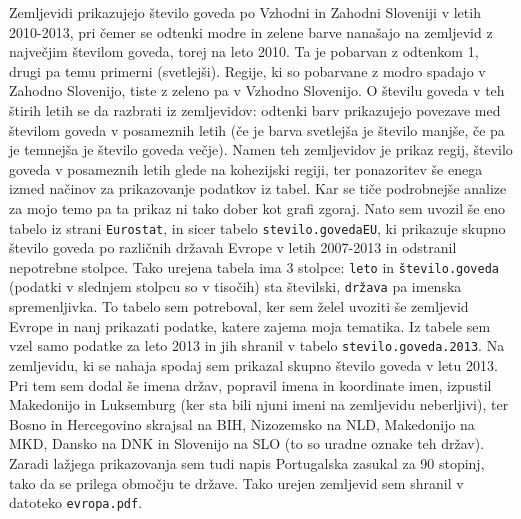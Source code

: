 \documentclass[11pt,a4paper]{article}
\begin{document}
\newline
\newline
Zemljevidi prikazujejo število goveda po Vzhodni in Zahodni Sloveniji v letih 2010-2013, pri čemer se odtenki modre in zelene barve nanašajo na zemljevid z največjim številom goveda, torej na leto 2010. Ta je pobarvan z odtenkom 1, drugi pa temu primerni (svetlejši). Regije, ki so pobarvane z modro spadajo v Zahodno Slovenijo, tiste z zeleno pa v Vzhodno Slovenijo. O številu goveda v teh štirih letih se da razbrati iz zemljevidov: odtenki barv prikazujejo povezave med številom goveda v posameznih letih (če je barva svetlejša je število manjše, če pa je temnejša je število goveda večje).
Namen teh zemljevidov je prikaz regij, število goveda v posameznih letih glede na kohezijski regiji, ter ponazoritev še enega izmed načinov za prikazovanje podatkov iz tabel. Kar se tiče podrobnejše analize za mojo temo pa ta prikaz ni tako dober kot grafi zgoraj.
\newline
\newline
\noindent Nato sem uvozil še eno tabelo iz strani \verb|Eurostat|, in sicer tabelo \verb|stevilo.govedaEU|, ki prikazuje skupno število goveda po različnih državah Evrope v letih 2007-2013 in odstranil nepotrebne stolpce. Tako urejena tabela ima 3 stolpce: \verb|leto| in \verb|število.goveda| (podatki v slednjem stolpcu so v tisočih) sta številski, \verb|država| pa imenska spremenljivka. To tabelo sem potreboval, ker sem želel uvoziti še zemljevid Evrope in nanj prikazati podatke, katere zajema moja tematika. Iz tabele sem vzel samo podatke za leto 2013 in jih shranil v tabelo \verb|stevilo.goveda.2013|.
\newline Na zemljevidu, ki se nahaja spodaj sem prikazal skupno število goveda v letu 2013. Pri tem sem dodal še imena držav, popravil imena in  koordinate imen, izpustil Makedonijo in Luksemburg (ker sta bili njuni imeni na zemljevidu neberljivi), ter Bosno in Hercegovino skrajsal na BIH, Nizozemsko na NLD, Makedonijo na MKD, Dansko na DNK in Slovenijo na SLO (to so uradne oznake teh držav). Zaradi lažjega prikazovanja sem tudi napis Portugalska zasukal za 90 stopinj, tako da se prilega območju te države. Tako urejen zemljevid sem shranil v datoteko \verb|evropa.pdf|.

\end{document}

